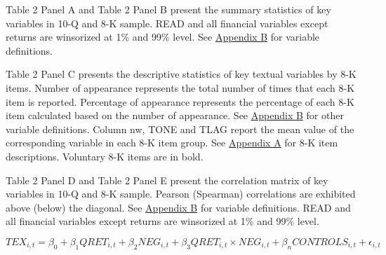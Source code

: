 

\newpage



Table 2 Panel A and Table 2 Panel B present the summary statistics of key variables in 10-Q and 8-K sample. READ and all financial variables except returns are winsorized at 1\% and 99\% level. See \hyperref[appb]{Appendix B} for variable definitions.

\newpage


Table 2 Panel C presents the descriptive statistics of key textual variables by 8-K items. Number of appearance represents the total number of times that each 8-K item is reported. Percentage of appearance represents the percentage of each 8-K item calculated based on the number of appearance. See \hyperref[appb]{Appendix B} for other variable definitions. Column nw, TONE and TLAG report the mean value of the corresponding variable in each 8-K item group. See \hyperref[appa]{Appendix A} for 8-K item descriptions. Voluntary 8-K items are in bold.

\newpage
\begin{landscape}



Table 2 Panel D and Table 2 Panel E present the correlation matrix of key variables in 10-Q and 8-K sample. Pearson (Spearman) correlations are exhibited above (below) the diagonal. See \hyperref[appb]{Appendix B} for variable definitions. READ and all financial variables except returns are winsorized at 1\% and 99\% level. 
\end{landscape}

\newpage

\setcounter{equation}{0}
\begin{equation}
TEX_{i,t}=\beta_0+\beta_1QRET_{i,t}+\beta_2NEG_{i,t}+\beta_3QRET_{i,t}\times NEG_{i,t}+\beta_nCONTROLS_{i,t}+\epsilon_{i,t}
\end{equation}

